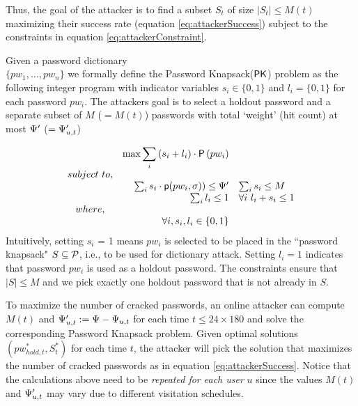 Thus, the goal of the attacker is to find a subset $S_t$ of size $|S_t| \leq M(t)$ maximizing their success rate (equation \ref{eq:attackerSuccess}) subject to the constraints in  equation \ref{eq:attackerConstraint}.


  Given a password dictionary \\$\{pw_1, \ldots, pw_n\}$ we formally define the \textsf{P}assword \textsf{K}napsack($\mathsf{PK}$) problem as the following integer program with indicator variables $s_i \in \{0,1\}$ and $l_i=\{0,1\}$ for each password $pw_i$. The attackers goal is to select a holdout password and a separate subset of $M$ ($=M(t)$) passwords with total `weight' (hit count)  at most $\Psi'$ ($= \Psi_{u,t}'$) 



$$
\begin{array}{crl}
&\max {\displaystyle{\sum_i {(s_i + l_i) \cdot \ensuremath{\mathsf{P}\left(pw_{i}\right)}}}} \\
subject\ to, &\\
&\sum_i{s_i \cdot \textsf{p}(pw_i,\sigma)) \le \Psi'} &\sum_i s_i \le M\\
&\sum_i l_i \le 1 &\forall i~ l_i + s_i \le 1\\
where,\\
& \forall i, s_i, l_i \in \{0,1\}
\end{array}
$$
Intuitively, setting $s_i$ = 1 means $pw_i$ is selected to be placed in the ``password knapsack" $S\subseteq \mathcal{P}$, i.e., to be used for dictionary attack. Setting $l_i=1$ indicates that password $pw_i$ is used as a holdout password. The constraints ensure that $|S| \leq M$ and we pick exactly one holdout password that is not already in $S$. 


 To maximize the number of cracked passwords, an online attacker can compute $M(t)$ and $\Psi_{u,t}':=\Psi- \Psi_{u,t}$ for each time $t \leq 24 \times 180$ and solve the corresponding \textsf{P}assword \textsf{K}napsack problem. Given optimal solutions $(pw_{hold,t}^*, S_t^*)$ for each time $t$, the attacker will pick the solution that maximizes the number of cracked passwords as in equation \ref{eq:attackerSuccess}. Notice that the calculations above need to be \textit{repeated for each user} $u$ since the values $M(t)$ and $\Psi_{u,t}'$ may vary due to different visitation schedules.

